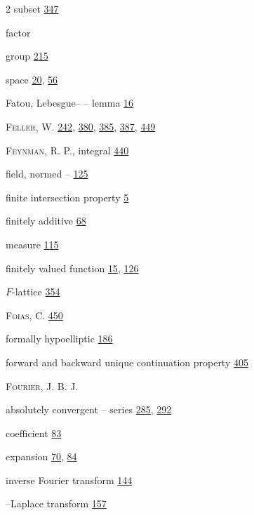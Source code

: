 \begin{multicols}{2}
\hspace*{1.1em}subset \hyperlink{page.347}{347}\par
\noindent factor\par
\hspace*{1.1em}group \hyperlink{page.215}{215}\par
\hspace*{1.1em}space \hyperlink{page.20}{20}, \hyperlink{page.56}{56}\par
\noindent Fatou, Lebesgue-- -- lemma \hyperlink{page.16}{16}\par
\noindent \textsc{Feller}, W. \hyperlink{page.242}{242}, \hyperlink{page.380}{380}, \hyperlink{page.385}{385}, \hyperlink{page.387}{387}, \hyperlink{page.449}{449}\par
\noindent \textsc{Feynman}, R. P., integral \hyperlink{page.440}{440}\par
\noindent field, normed -- \hyperlink{page.125}{125}\par
\noindent finite intersection property \hyperlink{page.5}{5}\par
\noindent finitely additive \hyperlink{page.68}{68}\par
\hspace*{1.1em}measure \hyperlink{page.115}{115}\par
\noindent finitely valued function \hyperlink{page.15}{15}, \hyperlink{page.126}{126}\par
\noindent $F$-lattice \hyperlink{page.354}{354}\par
\noindent \textsc{Foias}, C. \hyperlink{page.450}{450}\par
\noindent formally hypoelliptic \hyperlink{page.186}{186}\par
\noindent forward and backward unique continuation property \hyperlink{page.405}{405}\par
\noindent \textsc{Fourier}, J. B. J.\par
\hspace*{1.1em}absolutely convergent -- series \hyperlink{page.285}{285}, \hyperlink{page.292}{292}\par
\hspace*{1.1em}coefficient \hyperlink{page.83}{83}\par
\hspace*{1.1em}expansion \hyperlink{page.70}{70}, \hyperlink{page.84}{84}\par
\hspace*{1.1em}inverse Fourier transform \hyperlink{page.144}{144}\par
\hspace*{1.1em}--Laplace transform \hyperlink{page.157}{157}\par

\end{multicols}
